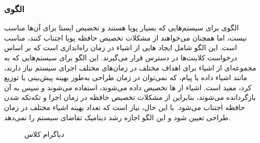 \subsubsection{الگوی }
\label{memPoolAllocSec}
\begin{RTL}
الگوی  \cite{ref4}
برای سیستم‌هایی که بسیار پویا هستند
و تخصیص ایستا برای آن‌ها مناسب نیست، اما همچنان می‌خواهند از
مشکلات تخصیص حافظه پویا اجتناب کنند، مناسب است.
این الگو شامل ایجاد هایی از اشیاء در زمان راه‌اندازی است که
بر اساس درخواست کلاینت‌ها در دسترس قرار می‌گیرند.
این الگو برای سیستم‌هایی که به مجموعه‌ای از اشیاء برای اهداف مختلف
در زمان‌های مختلف اجرای سیستم نیاز دارند، مانند اشیاء داده یا پیام،
که نمی‌توان در زمان طراحی به‌طور بهینه پیش‌بینی یا توزیع کرد، مفید است.
اشیاء از ها تخصیص داده می‌شوند، استفاده می‌شوند
و سپس به آن بازگردانده می‌شوند، بنابراین از مشکلات تخصیص حافظه
در زمان اجرا و تکه‌تکه شدن حافظه اجتناب می‌شود.
با این حال، نیاز است که تعداد بهینه اشیاء مختلف در
زمان طراحی تعیین شود و این الگو اجازه رشد دینامیک تقاضای سیستم را نمی‌دهد.
\end{RTL}
\begin{figure}[h!]
\centering
{}
\caption{دیاگرام کلاس }
\label{memPoolAllocClassDiag}
\end{figure}